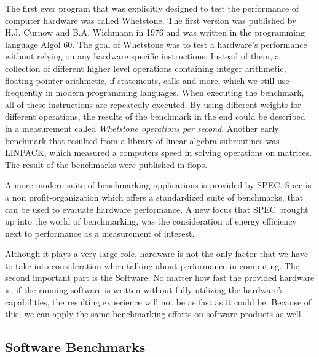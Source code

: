 The first ever program that was explicitly designed to test the performance of
computer hardware was called Whetstone. The first version was published by H.J.
Curnow and B.A. Wichmann in 1976 and was written in the programming language
Algol 60. The goal of Whetstone was to test a hardware's performance without
relying on any hardware specific instructions. Instead of them, a collection of
different higher level operations containing integer arithmetic, floating
pointer arithmetic, if statements, calls and more, which we still use frequently
in modern programming languages. When executing the benchmark, all of these
instructions are repeatedly executed. By using different weights for different
operations, the results of the benchmark in the end could be described in a
measurement called \emph{Whetstone operations per second}.  Another early
benchmark that resulted from a library of linear algebra subroutines was
LINPACK, which measured a computers speed in solving operations on matrices. The
result of the benchmarks were published in \gls{flops}.
\cite{OverviewBenchmarks}

A more modern suite of benchmarking applications is provided by SPEC. Spec is a
non profit-organization which offers a standardized suite of benchmarks, that
can be used to evaluate hardware performance. A new focus that SPEC brought up
into the world of benchmarking, was the consideration of energy efficiency next
to performance as a measurement of interest.
\cite{Spec}

Although it plays a very large role, hardware is not the only factor that we
have to take into consideration when talking about performance in computing. The
second important part is the Software. No matter how fast the provided hardware
is, if the running software is written without fully utilizing the hardware's
capabilities, the resulting experience will not be as fast as it could be.
Because of this, we can apply the same benchmarking efforts on software products
as well.



\subsection{Software Benchmarks}

